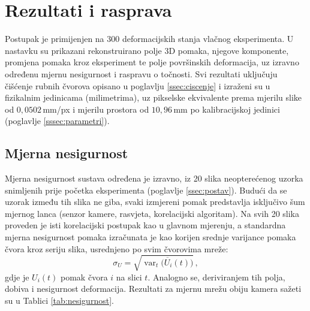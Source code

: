 \section{Rezultati i rasprava}
\label{sec:rezultati}

Postupak je primijenjen na 300 deformacijskih stanja vlačnog eksperimenta. U nastavku su
prikazani rekonstruirano polje 3D pomaka, njegove komponente, promjena pomaka kroz
eksperiment te polje površinskih deformacija, uz izravno određenu mjernu nesigurnost i
raspravu o točnosti. Svi rezultati
uključuju čišćenje rubnih čvorova opisano u poglavlju \ref{ssec:ciscenje} i
izraženi su u fizikalnim jedinicama (milimetrima), uz pikselske ekvivalente prema
mjerilu slike od $0{,}0502$\,mm/px i mjerilu prostora od $10{,}96$\,mm po
kalibracijskoj jedinici (poglavlje \ref{sssec:parametri}).


\subsection{Mjerna nesigurnost}
\label{ssec:nesigurnost}

Mjerna nesigurnost sustava određena je izravno, iz 20 slika neopterećenog uzorka
snimljenih prije početka eksperimenta (poglavlje \ref{ssec:postav}). Budući da se uzorak
između tih slika ne giba, svaki izmjereni pomak predstavlja isključivo šum mjernog
lanca (senzor kamere, rasvjeta, korelacijski algoritam). Na svih 20 slika
proveden je isti korelacijski postupak kao u glavnom mjerenju, a standardna
mjerna nesigurnost pomaka izračunata je kao korijen srednje varijance pomaka
čvora kroz seriju slika, usrednjeno po svim čvorovima mreže:
\begin{equation}
  \sigma_{U} = \sqrt{\overline{\operatorname{var}_t\!\big(U_i(t)\big)}}\,,
  \label{eq:sigma-u}
\end{equation}
gdje je $U_i(t)$ pomak čvora $i$ na slici $t$. Analogno se, deriviranjem tih
polja, dobiva i nesigurnost deformacija. Rezultati za mjernu mrežu obiju kamera
sažeti su u Tablici \ref{tab:nesigurnost}.

